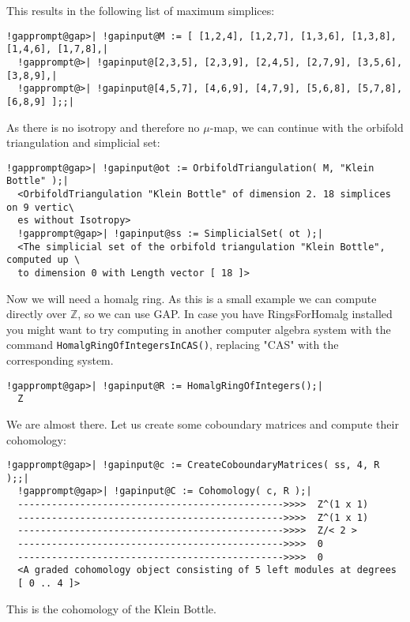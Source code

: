 \documentclass[a4paper,11pt]{report}
\begin{document}
{{ This results in the following list of maximum simplices: 
\begin{Verbatim}[commandchars=!@|,fontsize=\small,frame=single,label=Example]
  !gapprompt@gap>| !gapinput@M := [ [1,2,4], [1,2,7], [1,3,6], [1,3,8], [1,4,6], [1,7,8],|
  !gapprompt@>| !gapinput@[2,3,5], [2,3,9], [2,4,5], [2,7,9], [3,5,6], [3,8,9],|
  !gapprompt@>| !gapinput@[4,5,7], [4,6,9], [4,7,9], [5,6,8], [5,7,8], [6,8,9] ];;|
\end{Verbatim}
 As there is no isotropy and therefore no $\mu$-map, we can continue with the orbifold triangulation and simplicial set: 
\begin{Verbatim}[commandchars=!@|,fontsize=\small,frame=single,label=Example]
  !gapprompt@gap>| !gapinput@ot := OrbifoldTriangulation( M, "Klein Bottle" );|
  <OrbifoldTriangulation "Klein Bottle" of dimension 2. 18 simplices on 9 vertic\
  es without Isotropy>
  !gapprompt@gap>| !gapinput@ss := SimplicialSet( ot );|
  <The simplicial set of the orbifold triangulation "Klein Bottle", computed up \
  to dimension 0 with Length vector [ 18 ]>
\end{Verbatim}
 Now we will need a \textsf{homalg} ring. As this is a small example we can compute directly over
{\ensuremath{\mathbb Z}}, so we can use \textsf{GAP}. In case you have \textsf{RingsForHomalg} installed you might want to try computing in another computer algebra system
with the command \texttt{HomalgRingOfIntegersInCAS()}, replacing "CAS" with the corresponding system. 
\begin{Verbatim}[commandchars=!@|,fontsize=\small,frame=single,label=Example]
  !gapprompt@gap>| !gapinput@R := HomalgRingOfIntegers();|
  Z
\end{Verbatim}
 We are almost there. Let us create some coboundary matrices and compute their
cohomology: 
\begin{Verbatim}[commandchars=!@|,fontsize=\small,frame=single,label=Example]
  !gapprompt@gap>| !gapinput@c := CreateCoboundaryMatrices( ss, 4, R );;|
  !gapprompt@gap>| !gapinput@C := Cohomology( c, R );|
  ----------------------------------------------->>>>  Z^(1 x 1)
  ----------------------------------------------->>>>  Z^(1 x 1)
  ----------------------------------------------->>>>  Z/< 2 >
  ----------------------------------------------->>>>  0
  ----------------------------------------------->>>>  0
  <A graded cohomology object consisting of 5 left modules at degrees
  [ 0 .. 4 ]>
\end{Verbatim}
 This is the cohomology of the Klein Bottle. }

}
\end{document}
